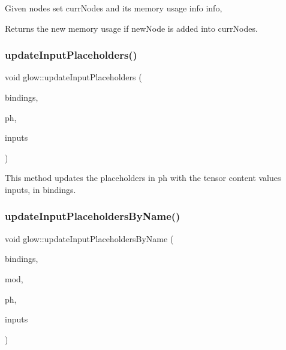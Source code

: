 Given nodes set {\ttfamily curr\+Nodes} and its memory usage info {\ttfamily info}, \begin{DoxyReturn}{Returns}
the new memory usage if {\ttfamily new\+Node} is added into {\ttfamily curr\+Nodes}. 
\end{DoxyReturn}
\mbox{\label{namespaceglow_a24661dfe4d11f5c1cf0db592389a43fc}} 
\subsubsection{\texorpdfstring{update\+Input\+Placeholders()}{updateInputPlaceholders()}}
{\footnotesize\ttfamily void glow\+::update\+Input\+Placeholders (\begin{DoxyParamCaption}\item[{\hyperlink{classglow_1_1_placeholder_bindings}{Placeholder\+Bindings} \&}]{bindings,  }\item[{llvm\+::\+Array\+Ref$<$ \hyperlink{classglow_1_1_placeholder}{Placeholder} $\ast$$>$}]{ph,  }\item[{llvm\+::\+Array\+Ref$<$ \hyperlink{classglow_1_1_tensor}{Tensor} $\ast$$>$}]{inputs }\end{DoxyParamCaption})}

This method updates the placeholders in {\ttfamily ph} with the tensor content values {\ttfamily inputs}, in {\ttfamily bindings}. \mbox{\label{namespaceglow_afe843dcf46487faf7eecfb58d8e15c04}} 
\subsubsection{\texorpdfstring{update\+Input\+Placeholders\+By\+Name()}{updateInputPlaceholdersByName()}}
{\footnotesize\ttfamily void glow\+::update\+Input\+Placeholders\+By\+Name (\begin{DoxyParamCaption}\item[{\hyperlink{classglow_1_1_placeholder_bindings}{Placeholder\+Bindings} \&}]{bindings,  }\item[{\hyperlink{classglow_1_1_module}{Module} $\ast$}]{mod,  }\item[{llvm\+::\+Array\+Ref$<$ llvm\+::\+String\+Ref $>$}]{ph,  }\item[{llvm\+::\+Array\+Ref$<$ \hyperlink{classglow_1_1_tensor}{Tensor} $\ast$$>$}]{inputs }\end{DoxyParamCaption})}

